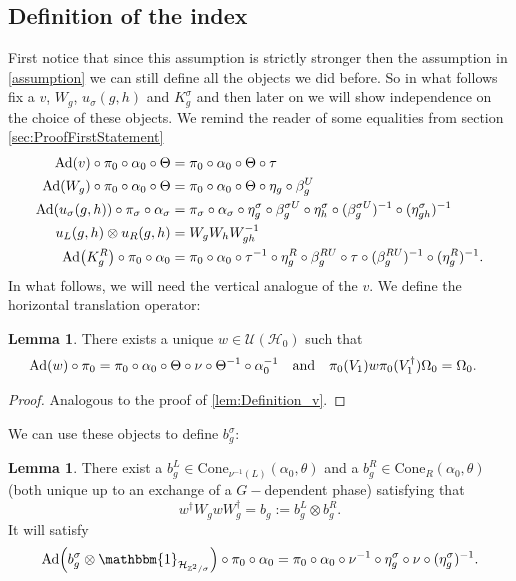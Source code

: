 \documentclass[12pt,a4paper,twoside]{article}
\let\originalleft\left
\let\originalright\right
\renewcommand{\left}{\mathopen{}\mathclose\bgroup\originalleft}
\renewcommand{\right}{\aftergroup\egroup\originalright}
\newcommand{\UU}{\mathcal U}
\newcommand{\HH}{\mathcal H}
\newcommand{\ZZ}{\mathbb Z}
\newcommand{\id}{\mathbbm{1}}
\newcommand{\Ad}[1]{\textrm{Ad}\left(#1\right)}
\theoremstyle{definition}
\newtheorem{lemma}[theorem]{Lemma}
\numberwithin{equation}{section}
\begin{document}
\subsection{Definition of the index}
 First notice that since this assumption is strictly stronger then the assumption in \ref{assumption} we can still define all the objects we did before. So in what follows fix a $v$, $W_g$, $u_\sigma(g,h)$ and $K_g^\sigma$ and then later on we will show independence on the choice of these objects. We remind the reader of some equalities from section \ref{sec:ProofFirstStatement}
\begin{align}
		\Ad{v}\circ\pi_0\circ\alpha_0\circ\Theta&=\pi_0\circ\alpha_0\circ\Theta\circ\tau\\
		\Ad{W_g}\circ\pi_0\circ\alpha_0\circ\Theta&=\pi_0\circ\alpha_0\circ\Theta\circ\eta_g\circ\beta_g^U\\
		\Ad{u_\sigma(g,h)}\circ\pi_\sigma\circ\alpha_\sigma&=\pi_\sigma\circ\alpha_\sigma\circ\eta_g^\sigma\circ\beta_g^{\sigma U}\circ\eta_h^{\sigma}\circ(\beta_g^{\sigma U})^{-1}\circ(\eta^\sigma_{gh})^{-1}\\
		u_L(g,h)\otimes u_R(g,h)&=W_gW_hW_{gh}^{-1}\\
		\Ad{K^R_g}\circ\pi_0\circ\alpha_0&=\pi_0\circ \alpha_0\circ \tau^{-1}\circ \eta_g^R\circ\beta_g^{RU}\circ\tau\circ(\beta_g^{RU})^{-1}\circ(\eta_g^{R})^{-1}.
	\end{align}
In what follows, we will need the vertical analogue of the $v$. We define the horizontal translation operator:
\begin{lemma}\label{lem:Definition_w}
	There exists a unique $w\in\UU(\HH_0)$ such that
	\begin{align}
		\Ad{w}\circ\pi_0&=\pi_0\circ\alpha_0\circ\Theta\circ\nu\circ\Theta^{-1}\circ\alpha_0^{-1}&&\text{and}&\pi_0(V_1)w\pi_0(V_1^\dagger)\Omega_0&=\Omega_0.
	\end{align}
\end{lemma}
\begin{proof}
	Analogous to the proof of \ref{lem:Definition_v}.
\end{proof}
 We can use these objects to define $b^\sigma_g$:
\begin{lemma}
	There exist a $b_g^L\in\textrm{Cone}_{\nu^{-1}(L)}(\alpha_0,\theta)$ and a $b_g^R\in\textrm{Cone}_{R}(\alpha_0,\theta)$ (both unique up to an exchange of a $G-$dependent phase) satisfying that
	\begin{equation}
		w^\dagger W_g w W_g^\dagger=b_g:=b_g^L\otimes b_g^R.
	\end{equation}
	It will satisfy
	\begin{equation}\label{eq:automorphismBelongingTo_b}
		\Ad{b_g^\sigma\otimes\id_{\HH_{\ZZ^2/\sigma}}}\circ\pi_0\circ\alpha_0=\pi_0\circ\alpha_0\circ\nu^{-1}\circ\eta_g^\sigma\circ\nu\circ(\eta_g^\sigma)^{-1}.
	\end{equation}
\end{lemma}
\end{document}
